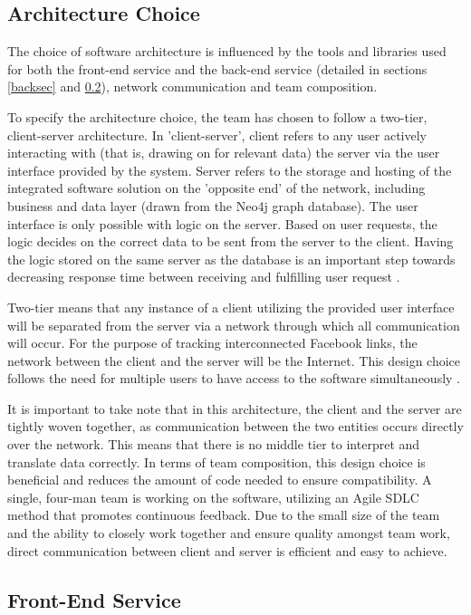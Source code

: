 \documentclass[12pt,onecolumn]{article}
\begin{document}
	\subsection{Architecture Choice}
	The choice of software architecture is influenced by the tools and libraries used for both the front-end service and the back-end service (detailed in sections \ref{backsec} and \ref{frontsec}), network communication and team composition. 

	To specify the architecture choice, the team has chosen to follow a two-tier, client-server architecture. In 'client-server', client refers to any user actively interacting with (that is, drawing on for relevant data) the server via the user interface provided by the system. Server refers to the storage and hosting of the integrated software solution on the 'opposite end' of the network, including business and data layer (drawn from the Neo4j graph database). The user interface is only possible with logic on the server. Based on user requests, the logic decides on the correct data to be sent from the server to the client. Having the logic stored on the same server as the database is an important step towards decreasing response time between receiving and fulfilling user request \cite{twotieradvantage}. 

	Two-tier means that any instance of a client utilizing the provided user interface will be separated from the server via a network through which all communication will occur. For the purpose of tracking interconnected Facebook links, the network between the client and the server will be the Internet. This design choice follows the need for multiple users to have access to the software simultaneously \cite{beginningsofteng}. 

	It is important to take note that in this architecture, the client and the server are tightly woven together, as communication between the two entities occurs directly over the network. This means that there is no middle tier to interpret and translate data correctly. In terms of team composition, this design choice is beneficial and reduces the amount of code needed to ensure compatibility. A single, four-man team is working on the software, utilizing an Agile SDLC method that promotes continuous feedback. Due to the small size of the team and the ability to closely work together and ensure quality amongst team work, direct communication between client and server is efficient and easy to achieve.

	\subsection{Front-End Service} \label{frontsec}
\end{document}
